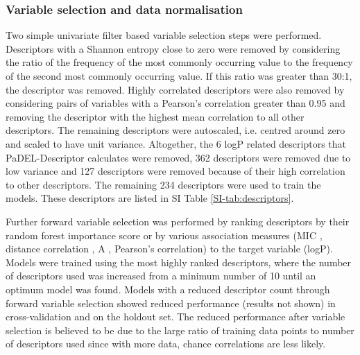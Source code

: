 \documentclass[10pt]{bmc_article}
\newenvironment{bmcformat}{\begin{raggedright}\baselineskip20pt\sloppy\setboolean{publ}{false}}{\end{raggedright}\baselineskip20pt\sloppy}
\begin{document}
\begin{bmcformat}
\subsubsection*{Variable selection and data normalisation}
Two simple univariate filter based variable selection steps were performed. Descriptors with a Shannon entropy close to zero were removed by considering the ratio of the frequency of the most commonly occurring value to the frequency of the second most commonly occurring value. If this ratio was greater than 30:1, the descriptor was removed. Highly correlated descriptors were also removed by considering pairs of variables with a Pearson's correlation greater than 0.95 and removing the descriptor with the highest mean correlation to all other descriptors. The remaining descriptors were autoscaled, i.e. centred around zero and scaled to have unit variance. Altogether, the 6 logP related descriptors that PaDEL-Descriptor calculates were removed, 362 descriptors were removed due to low variance and 127 descriptors were removed because of their high correlation to other descriptors. The remaining 234 descriptors were used to train the models. These descriptors are listed in SI Table \ref{SI-tab:descriptors}.

Further forward variable selection was performed by ranking descriptors by their random forest importance score or by various association measures (MIC \cite{reshef_detecting_2011}, distance correlation \cite{szekely_measuring_2007}, A \cite{murrell_discovering_2013}, Pearson's correlation) to the target variable (logP). Models were trained using the most highly ranked descriptors, where the number of descriptors used was increased from a minimum number of 10 until an optimum model was found. Models with a reduced descriptor count through forward variable selection showed reduced performance (results not shown) in cross-validation and on the holdout set. The reduced performance after variable selection is believed to be due to the large ratio of training data points to number of descriptors used since with more data, chance correlations are less likely.


\end{bmcformat}
\end{document}
